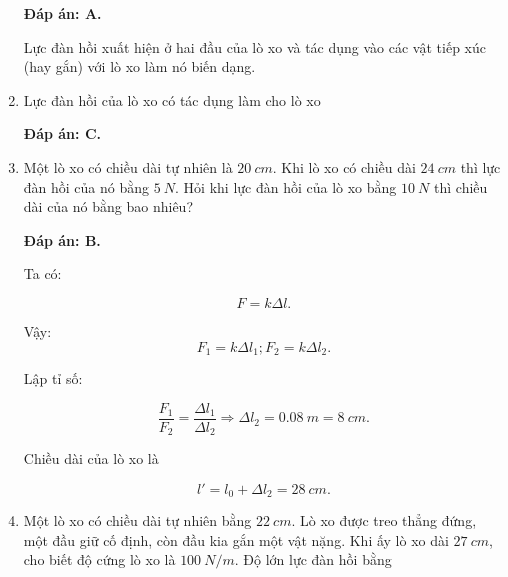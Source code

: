 \begin{enumerate}[label=\bfseries Câu \arabic*:, leftmargin=1.5cm]
	\hideall
	{	
		\textbf{Đáp án: A.}
		
		Lực đàn hồi xuất hiện ở hai đầu của lò xo và tác dụng vào các vật tiếp xúc (hay gắn) với lò xo làm nó biến dạng.
	}
	\item {}
	
	
	{
		Lực đàn hồi của lò xo có tác dụng làm cho lò xo
	}
	
	\hideall
	{	
		\textbf{Đáp án: C.}
	}
	\item {}
	
	
	{
		Một lò xo có chiều dài tự nhiên là $\SI{20}{cm}$. Khi lò xo có chiều dài $\SI{24}{cm}$ thì lực đàn hồi của nó bằng $\SI{5}{N}$. Hỏi khi lực đàn hồi của lò xo bằng $\SI{10}{N}$ thì chiều dài của nó bằng bao nhiêu?
	}
	
	\hideall
	{	
		\textbf{Đáp án: B.}
		
		Ta có:
		
		$$F = k \Delta l.$$
		
		Vậy: 
		$$F_1 = k \Delta l_1; F_2 = k \Delta l_2.$$
		
		Lập tỉ số:
		
		$$\dfrac{F_1}{F_2} = \dfrac{\Delta l_1}{\Delta l_2} \Rightarrow \Delta l_2 = \SI{0,08}{m} = \SI{8}{cm}.$$
		
		Chiều dài của lò xo là
		
		$$l' = l_0 + \Delta l_2 = \SI{28}{cm}.$$
	}
	\item {}
	
	
	{
		Một lò xo có chiều dài tự nhiên bằng $\SI{22}{cm}$. Lò xo được treo thẳng đứng, một đầu giữ cố định, còn đầu kia gắn một vật nặng. Khi ấy lò xo dài $\SI{27}{cm}$, cho biết độ cứng lò xo là $\SI{100}{N/m}$. Độ lớn lực đàn hồi bằng 
	}
	

\end{enumerate}
